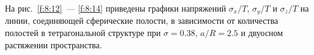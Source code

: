 



На рис.~\ref{f:8:12}~--- \ref{f:8:14} приведены графики напряжений $\sigma_x/T$, $\sigma_y/T$ и $\sigma_z/T$ на линии, соединяющей сферические полости, в зависимости от количества полостей в тетрагональной структуре при $\sigma=0.38$, $a/R=2.5$ и двуосном растяжении пространства.

